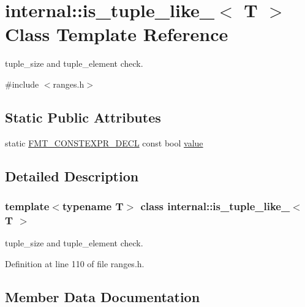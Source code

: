\hypertarget{classinternal_1_1is__tuple__like__}{}\section{internal\+:\+:is\+\_\+tuple\+\_\+like\+\_\+$<$ T $>$ Class Template Reference}
\label{classinternal_1_1is__tuple__like__}


tuple\+\_\+size and tuple\+\_\+element check.  




{\ttfamily \#include $<$ranges.\+h$>$}

\subsection*{Static Public Attributes}
\begin{DoxyCompactItemize}
\item 
static \hyperlink{core_8h_af4388801466a5994a363d6005616371a}{F\+M\+T\+\_\+\+C\+O\+N\+S\+T\+E\+X\+P\+R\+\_\+\+D\+E\+CL} const bool \hyperlink{classinternal_1_1is__tuple__like___a2d78d2520f310397d1bad082dc3e3fa0}{value}
\end{DoxyCompactItemize}


\subsection{Detailed Description}
\subsubsection*{template$<$typename T$>$\newline
class internal\+::is\+\_\+tuple\+\_\+like\+\_\+$<$ T $>$}

tuple\+\_\+size and tuple\+\_\+element check. 

Definition at line 110 of file ranges.\+h.



\subsection{Member Data Documentation}
\mbox{\label{classinternal_1_1is__tuple__like___a2d78d2520f310397d1bad082dc3e3fa0}} 
